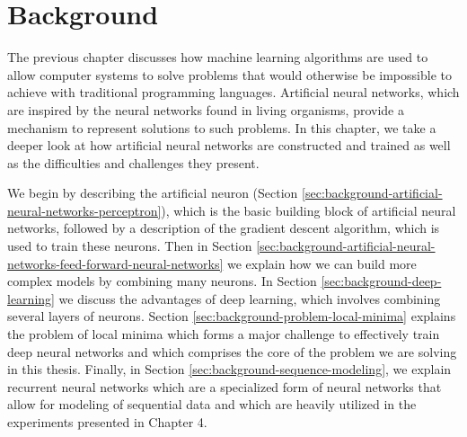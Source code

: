 \chapter{Background} \label{sec:background}

The previous chapter discusses how machine learning algorithms are used to allow computer systems to solve problems that would otherwise be impossible to achieve with traditional programming languages. Artificial neural networks, which are inspired by the neural networks found in living organisms, provide a mechanism to represent solutions to such problems. In this chapter, we take a deeper look at how artificial neural networks are constructed and trained as well as the difficulties and challenges they present.

We begin by describing the artificial neuron (Section \ref{sec:background-artificial-neural-networks-perceptron}), which is the basic building block of artificial neural networks, followed by a description of the gradient descent algorithm, which is used to train these neurons. Then in Section \ref{sec:background-artificial-neural-networks-feed-forward-neural-networks} we explain how we can build more complex models by combining many neurons. In Section \ref{sec:background-deep-learning} we discuss the advantages of deep learning, which involves combining several layers of neurons. Section \ref{sec:background-problem-local-minima} explains the problem of local minima which forms a major challenge to effectively train deep neural networks and which comprises the core of the problem we are solving in this thesis. Finally, in Section \ref{sec:background-sequence-modeling}, we explain recurrent neural networks which are a specialized form of neural networks that allow for modeling of sequential data and which are heavily utilized in the experiments presented in Chapter 4.







